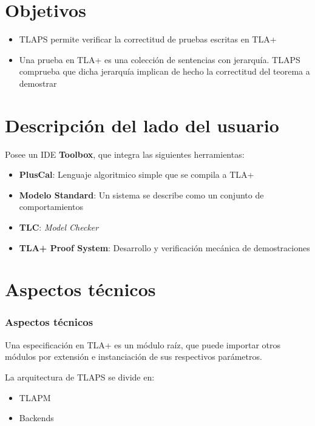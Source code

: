 \documentclass[12pt]{beamer}
\newenvironment{stepitemize}{\begin{itemize}[<+->]}{\end{itemize} }
\begin{document}
\section{Objetivos}
\begin{frame}
\begin{stepitemize}
 \item TLAPS permite verificar la correctitud de pruebas escritas en TLA+
 \item Una prueba en TLA+ es una colección de sentencias con jerarquía. TLAPS comprueba que dicha jerarquía implican de hecho la correctitud del teorema a demostrar
\end{stepitemize}
\end{frame}


\section[Descripción]{Descripción del lado del usuario}
\begin{frame}
    Posee un IDE \textbf{Toolbox}, que integra las siguientes herramientas:
      \begin{stepitemize}
	\item \textbf{PlusCal}: Lenguaje algoritmico simple que se compila a TLA+
	\item \textbf{Modelo Standard}: Un sistema se describe como un conjunto de comportamientos
	\item \textbf{TLC}: \textit{Model Checker}
	\item \textbf{TLA+ Proof System}: Desarrollo y verificación mecánica de demostraciones
      \end{stepitemize}

\end{frame}


\section{Aspectos técnicos}
\begin{frame}
\frametitle{Aspectos técnicos}
  Una especificación en TLA+ es un módulo raíz, que puede importar otros módulos por extensión e instanciación de sus respectivos parámetros.
  \pause
  
  La arquitectura de TLAPS se divide en:
  \begin{stepitemize}
    \item TLAPM
    \item Backends
  \end{stepitemize}

\end{frame}
\end{document}
